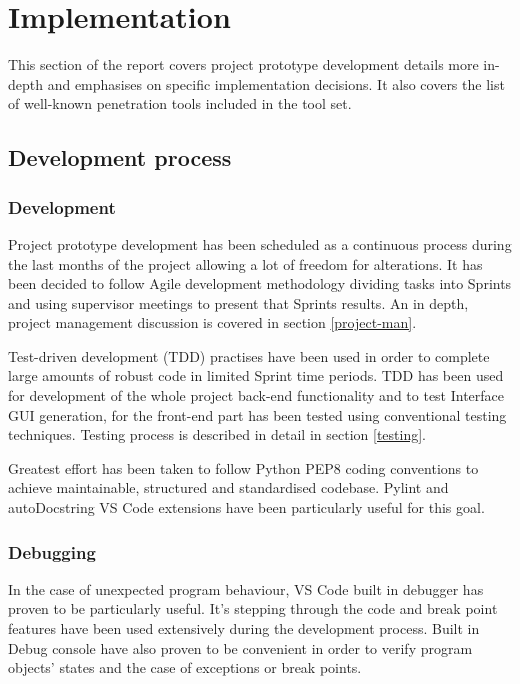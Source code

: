 

\section{Implementation}
This section of the report covers project prototype development details more in-depth and emphasises on specific implementation decisions. It also covers the list of well-known penetration tools included in the tool set.

\subsection{Development process}
	\subsubsection{Development}
	Project prototype development has been scheduled as a continuous process during the last months of the project allowing a lot of freedom for alterations. It has been decided to follow Agile development methodology dividing tasks into Sprints and using supervisor meetings to present that Sprints results. An in depth, project management discussion is covered in section \ref{project-man}.
	
	Test-driven development (TDD) practises have been used in order to complete large amounts of robust code in limited Sprint time periods.  TDD has been used for development of the whole project back-end functionality and to test Interface GUI generation, for the front-end part has been tested using conventional testing techniques. Testing process is described in detail in section \ref{testing}.
	
	Greatest effort has been taken to follow Python PEP8 coding conventions to achieve maintainable, structured and standardised codebase. Pylint and autoDocstring VS Code extensions have been particularly useful for this goal.
	
	\subsubsection{Debugging}
	In the case of unexpected program behaviour, VS Code built in debugger has proven to be particularly useful. It's stepping through the code and break point features have been used extensively during the development process. Built in Debug console have also proven to be convenient in order to verify program objects' states and the case of exceptions or break points. 
	
